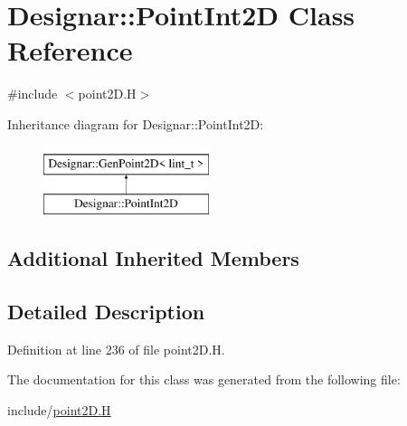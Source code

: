 \hypertarget{class_designar_1_1_point_int2_d}{}\section{Designar\+:\+:Point\+Int2D Class Reference}
\label{class_designar_1_1_point_int2_d}


{\ttfamily \#include $<$point2\+D.\+H$>$}

Inheritance diagram for Designar\+:\+:Point\+Int2D\+:\begin{figure}[H]
\begin{center}
\leavevmode
\includegraphics[height=2.000000cm]{class_designar_1_1_point_int2_d}
\end{center}
\end{figure}
\subsection*{Additional Inherited Members}


\subsection{Detailed Description}


Definition at line 236 of file point2\+D.\+H.



The documentation for this class was generated from the following file\+:\begin{DoxyCompactItemize}
\item 
include/\hyperlink{point2_d_8_h}{point2\+D.\+H}\end{DoxyCompactItemize}
